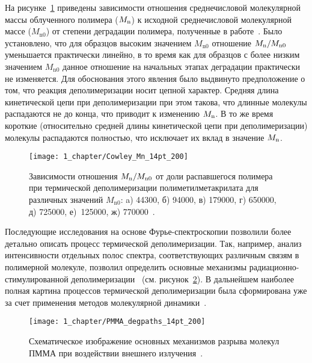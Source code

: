 На рисунке~\ref{fig:Cowley_Mn} приведены зависимости отношения среднечисловой молекулярной массы облученного полимера ($M_\mathrm{n}$) к исходной среднечисловой молекулярной массе ($M_\mathrm{n0}$) от степени деградации полимера, полученные в работе~\cite{Cowley_1952_1}.
Было установлено, что для образцов высоким значением $M_\mathrm{n0}$ отношение $M_\mathrm{n} / M_\mathrm{n0}$ уменьшается практически линейно, в то время как для образцов с более низким значением $M_\mathrm{n0}$ данное отношение на начальных этапах деградации практически не изменяется.
Для обоснования этого явления было выдвинуто предположение о том, что реакция деполимеризации носит цепной характер.
Средняя длина кинетической цепи при деполимеризации при этом такова, что длинные молекулы распадаются не до конца, что приводит к изменению $M_\mathrm{n}$.
В то же время короткие (относительно средней длины кинетической цепи при деполимеризации) молекулы распадаются полностью, что исключает их вклад в значение $M_\mathrm{n}$.

\begin{figure}[t]
	\centering
	\texttt{[image: 1\_chapter/Cowley\_Mn\_14pt\_200]}
	\vspace{0.5em}
	\caption{Зависимости отношения $M_\mathrm{n} / M_\mathrm{n0}$ от доли распавшегося полимера при термической деполимеризации полиметилметакрилата для различных значений $M_\mathrm{n0}$: a) 44300, б) 94000, в) 179000, г) 650000, д) 725000, е)~125000, ж) 770000~\cite{Cowley_1952_1}.}
	\label{fig:Cowley_Mn}
\end{figure}

Последующие исследования на основе Фурье-спектроскопии позволили более детально описать процесс термической деполимеризации.
Так, например, анализ интенсивности отдельных полос спектра, соответствующих различным связям в полимерной молекуле, позволил определить основные механизмы радиационно-стимулированной деполимеризации~\cite{Bermudez} (см. рисунок~\ref{fig:PMMA_degpaths}).
В дальнейшем наиболее полная картина процессов термической деполимеризации была сформирована уже за счет применения методов молекулярной динамики~\cite{Stoliarov}.

\begin{figure}[t]
	\centering
	\texttt{[image: 1\_chapter/PMMA\_degpaths\_14pt\_200]}
	\caption{Схематическое изображение основных механизмов разрыва молекул ПММА при воздействии внешнего излучения~\cite{Bermudez}.}
	\label{fig:PMMA_degpaths}
\end{figure}

